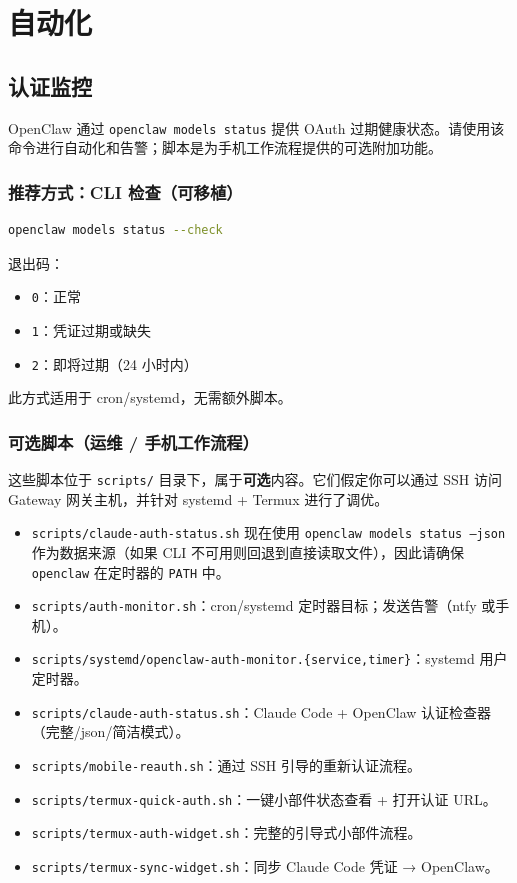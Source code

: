 \chapter{自动化}

\section{认证监控}


OpenClaw 通过 \texttt{openclaw models status} 提供 OAuth 过期健康状态。请使用该命令进行自动化和告警；脚本是为手机工作流程提供的可选附加功能。

\subsection{推荐方式：CLI 检查（可移植）}


\begin{lstlisting}[language=bash]
openclaw models status --check
\end{lstlisting}


退出码：

\begin{itemize}
  \item \texttt{0}：正常
  \item \texttt{1}：凭证过期或缺失
  \item \texttt{2}：即将过期（24 小时内）
\end{itemize}


此方式适用于 cron/systemd，无需额外脚本。

\subsection{可选脚本（运维 / 手机工作流程）}


这些脚本位于 \texttt{scripts/} 目录下，属于\textbf{可选}内容。它们假定你可以通过 SSH 访问 Gateway 网关主机，并针对 systemd + Termux 进行了调优。

\begin{itemize}
  \item \texttt{scripts/claude-auth-status.sh} 现在使用 \texttt{openclaw models status --json} 作为数据来源（如果 CLI 不可用则回退到直接读取文件），因此请确保 \texttt{openclaw} 在定时器的 \texttt{PATH} 中。
  \item \texttt{scripts/auth-monitor.sh}：cron/systemd 定时器目标；发送告警（ntfy 或手机）。
  \item \texttt{scripts/systemd/openclaw-auth-monitor.\{service,timer\}}：systemd 用户定时器。
  \item \texttt{scripts/claude-auth-status.sh}：Claude Code + OpenClaw 认证检查器（完整/json/简洁模式）。
  \item \texttt{scripts/mobile-reauth.sh}：通过 SSH 引导的重新认证流程。
  \item \texttt{scripts/termux-quick-auth.sh}：一键小部件状态查看 + 打开认证 URL。
  \item \texttt{scripts/termux-auth-widget.sh}：完整的引导式小部件流程。
  \item \texttt{scripts/termux-sync-widget.sh}：同步 Claude Code 凭证 → OpenClaw。
\end{itemize}


